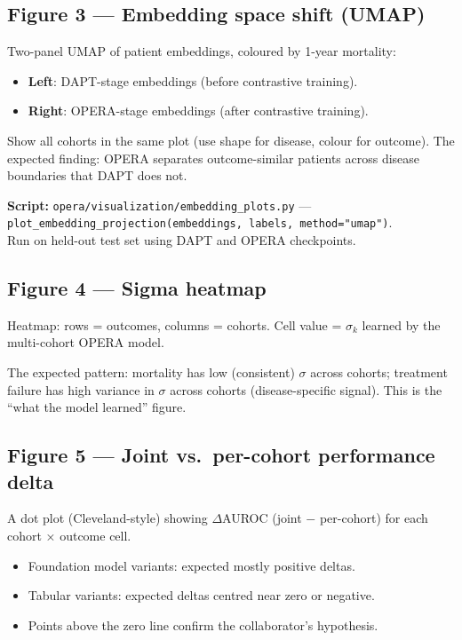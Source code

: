\documentclass[11pt, a4paper]{article}
\newcommand{\code}[1]{\texttt{\small #1}}
\begin{document}
\subsection{Figure 3 — Embedding space shift (UMAP)}

Two-panel UMAP of patient embeddings, coloured by 1-year mortality:
\begin{itemize}[leftmargin=2em, itemsep=1pt]
  \item \textbf{Left}: DAPT-stage embeddings (before contrastive training).
  \item \textbf{Right}: OPERA-stage embeddings (after contrastive training).
\end{itemize}
Show all cohorts in the same plot (use shape for disease, colour for
outcome). The expected finding: OPERA separates outcome-similar patients
across disease boundaries that DAPT does not.

\medskip
\begin{tcolorbox}[notebox]
  \textbf{Script:} \code{opera/visualization/embedding\_plots.py} —
  \code{plot\_embedding\_projection(embeddings, labels, method="umap")}. \\
  Run on held-out test set using DAPT and OPERA checkpoints.
\end{tcolorbox}

\subsection{Figure 4 — Sigma heatmap}

Heatmap: rows = outcomes, columns = cohorts.
Cell value = $\sigma_k$ learned by the multi-cohort OPERA model.

The expected pattern: mortality has low (consistent) $\sigma$ across
cohorts; treatment failure has high variance in $\sigma$ across cohorts
(disease-specific signal). This is the ``what the model learned''
figure.

\subsection{Figure 5 — Joint vs.\ per-cohort performance delta}

A dot plot (Cleveland-style) showing $\Delta$AUROC (joint $-$ per-cohort)
for each cohort × outcome cell.

\begin{itemize}[leftmargin=2em, itemsep=1pt]
  \item Foundation model variants: expected mostly positive deltas.
  \item Tabular variants: expected deltas centred near zero or negative.
  \item Points above the zero line confirm the collaborator's hypothesis.
\end{itemize}
\end{document}
